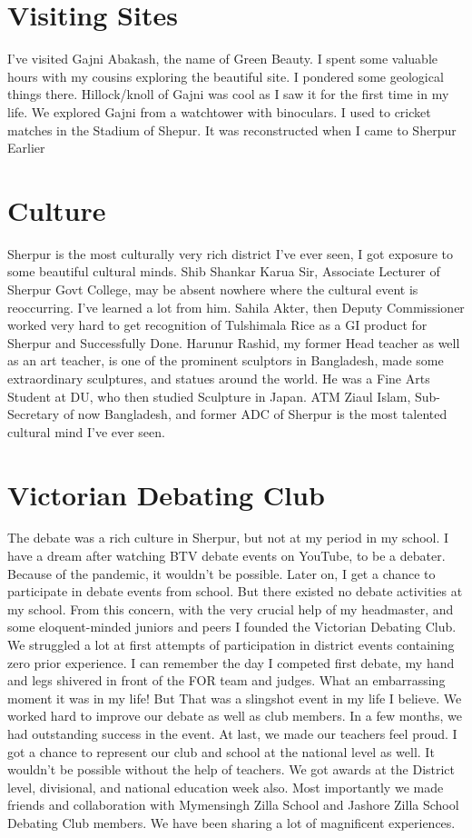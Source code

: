 \documentclass{article}
\begin{document}
\section{Visiting Sites} 
I've visited Gajni Abakash, the name of Green Beauty. I spent some valuable hours with my cousins exploring the beautiful site. I pondered some geological things there. Hillock/knoll of Gajni was cool as I saw it for the first time in my life. We explored Gajni from a watchtower with binoculars. I used to cricket matches in the Stadium of Shepur. It was reconstructed when I came to Sherpur Earlier

\section{Culture} 
Sherpur is the most culturally very rich district I've ever seen, I got exposure to some beautiful cultural minds. Shib Shankar Karua Sir, Associate Lecturer of Sherpur Govt College, may be absent nowhere where the cultural event is reoccurring. I've learned a lot from him. Sahila Akter, then Deputy Commissioner worked very hard to get recognition of Tulshimala Rice as a GI product for Sherpur and Successfully Done. Harunur Rashid, my former Head teacher as well as an art teacher, is one of the prominent sculptors in Bangladesh, made some extraordinary sculptures, and statues around the world. He was a Fine Arts Student at DU, who then studied Sculpture in Japan. ATM Ziaul Islam, Sub-Secretary of now Bangladesh, and former ADC of Sherpur is the most talented cultural mind I've ever seen. 


\section{Victorian Debating Club} 
The debate was a rich culture in Sherpur, but not at my period in my school. I have a dream after watching BTV debate events on YouTube, to be a debater. Because of the pandemic, it wouldn't be possible. Later on, I get a chance to participate in debate events from school. But there existed no debate activities at my school. From this concern, with the very crucial help of my headmaster, and some eloquent-minded juniors and peers I founded the Victorian Debating Club. We struggled a lot at first attempts of participation in district events containing zero prior experience. I can remember the day I competed first debate, my hand and legs shivered in front of the FOR team and judges. What an embarrassing moment it was in my life! But That was a slingshot event in my life I believe. We worked hard to improve our debate as well as club members. In a few months, we had outstanding success in the event. At last, we made our teachers feel proud. I got a chance to represent our club and school at the national level as well. It wouldn't be possible without the help of teachers. We got awards at the District level, divisional, and national education week also. Most importantly we made friends and collaboration with Mymensingh Zilla School and Jashore Zilla School Debating Club members. We have been sharing a lot of magnificent experiences.
\end{document}
